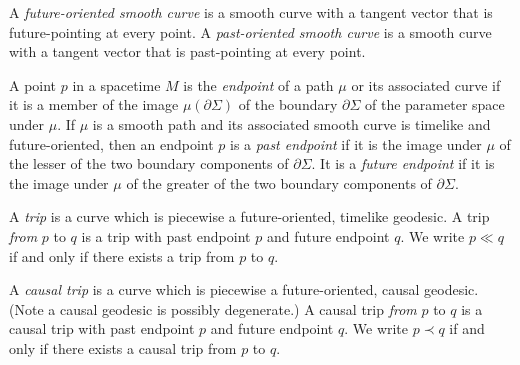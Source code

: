\begin{definition}
    \label{def:future-and-past-oriented-smooth-curves}
    \leanok
    A \textit{future-oriented smooth curve} is a smooth curve with a tangent vector that is future-pointing at every point. A \textit{past-oriented smooth curve} is a smooth curve with a tangent vector that is past-pointing at every point.
\end{definition}

\begin{definition}[Endpoints]
    \label{def:endpoints}
    \leanok
    A point $p$ in a spacetime $M$ is the \textit{endpoint} of a path $\mu$ or its associated curve if it is a member of the image $\mu(\partial\Sigma)$ of the boundary $\partial\Sigma$ of the parameter space under $\mu$. If $\mu$ is a smooth path and its associated smooth curve is timelike and future-oriented, then an endpoint $p$ is a \textit{past endpoint} if it is the image under $\mu$ of the lesser of the two boundary components of $\partial\Sigma$. It is a \textit{future endpoint} if it is the image under $\mu$ of the greater of the two boundary components of $\partial\Sigma$.
\end{definition}

\begin{definition}[Trip]
    \label{def:trip}
    \leanok
    A \textit{trip} is a curve which is piecewise a future-oriented, timelike geodesic. A trip \textit{from} $p$ to $q$ is a trip with past endpoint $p$ and future endpoint $q$. We write $p \ll q$ if and only if there exists a trip from $p$ to $q$.
\end{definition}

\begin{definition}
    \label{def:causal-trip}
    \leanok
    A \textit{causal trip} is a curve which is piecewise a future-oriented, causal geodesic. (Note a causal geodesic is possibly degenerate.) A causal trip \textit{from} $p$ to $q$ is a causal trip with past endpoint $p$ and future endpoint $q$. We write $p \prec q$ if and only if there exists a causal trip from $p$ to $q$.
\end{definition}

